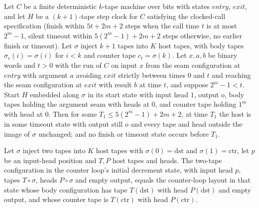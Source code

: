 \begin{theorem}
\label{Turing.NTimeDiag.qy_clockHost_timeout}
\leanok
{}
Let $C$ be a finite deterministic $k$-tape machine over bits with states $\mathit{entry}$,
$\mathit{exit}$, and let $H$ be a $(k+1)$-tape step clock for $C$ satisfying the clocked-call
specification (finish within $5t + 2m + 2$ steps when the call time $t$ is at most $2^m - 1$,
silent timeout within $5(2^m - 1) + 2m + 2$ steps otherwise, no earlier finish or timeout). Let
$\sigma$ inject $k + 1$ tapes into $K$ host tapes, with body tapes $\sigma_c(i) = \sigma(i)$ for
$i < k$ and counter tape $c_t = \sigma(k)$. Let $x, a, b$ be binary words and $t > 0$ with the run
of $C$ on input $x$ from the seam configuration at $\mathit{entry}$ with argument $a$ avoiding
$\mathit{exit}$ strictly between times $0$ and $t$ and reaching the seam configuration at
$\mathit{exit}$ with result $b$ at time $t$, and suppose $2^m - 1 < t$. Start $H$ embedded along
$\sigma$ in its start state with input head $1$, output $o$, body tapes holding the argument seam
with heads at $0$, and counter tape holding $1^m$ with head at $0$. Then for some
$T_1 \le 5(2^m - 1) + 2m + 2$, at time $T_1$ the host is in some timeout state with output still
$o$ and every tape and head outside the image of $\sigma$ unchanged; and no finish or timeout
state occurs before $T_1$.
\end{theorem}

\begin{theorem}
\label{Turing.NTimeDiag.qy_expand_start}
\leanok
{}
Let $\sigma$ inject two tapes into $K$ host tapes with $\sigma(0) = \mathrm{dst}$ and
$\sigma(1) = \mathrm{ctr}$, let $p$ be an input-head position and $T, P$ host tapes and heads.
The two-tape configuration in the counter loop's initial decrement state, with input head $p$,
tapes $T \circ \sigma$, heads $P \circ \sigma$ and empty output, equals the counter-loop layout
in that state whose body configuration has tape $T(\mathrm{dst})$ with head $P(\mathrm{dst})$
and empty output, and whose counter tape is $T(\mathrm{ctr})$ with head $P(\mathrm{ctr})$.
\end{theorem}


